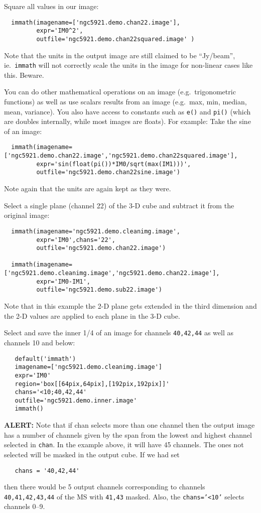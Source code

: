 Square all values in our image:
\small
\begin{verbatim}
  immath(imagename=['ngc5921.demo.chan22.image'],
         expr='IM0^2',
         outfile='ngc5921.demo.chan22squared.image' )
\end{verbatim}
\normalsize
Note that the units in the output image are still claimed to be
``Jy/beam'', ie.\ {\tt immath} will not correctly scale the units
in the image for non-linear cases like this.  Beware.

You can do other mathematical operations on an image (e.g.\
trigonometric functions) as well as use scalars results from an image
(e.g.\ max, min, median, mean, variance).  You also have access to
constants such as {\tt e()} and {\tt pi()} (which are doubles
internally, while most images are floats). For example:
Take the sine of an image:
\small
\begin{verbatim}
  immath(imagename=['ngc5921.demo.chan22.image','ngc5921.demo.chan22squared.image'],
         expr='sin(float(pi())*IM0/sqrt(max(IM1)))',
         outfile='ngc5921.demo.chan22sine.image')
\end{verbatim}
\normalsize
Note again that the units are again kept as they were.
    
Select a single plane (channel 22) of the 3-D cube and  
subtract it from the original image: 
\small
\begin{verbatim}
  immath(imagename='ngc5921.demo.cleanimg.image',
         expr='IM0',chans='22',
         outfile='ngc5921.demo.chan22.image')

  immath(imagename=['ngc5921.demo.cleanimg.image','ngc5921.demo.chan22.image'],
         expr='IM0-IM1',
         outfile='ngc5921.demo.sub22.image')
\end{verbatim}
\normalsize
Note that in this example the 2-D plane gets extended in the third
dimension and the 2-D values are applied to each plane in the 3-D cube. 

    
Select and save the inner 1/4 of an image for channels {\tt 40,42,44}
as well as channels 10 and below:
\small
\begin{verbatim}
   default('immath')
   imagename=['ngc5921.demo.cleanimg.image']
   expr='IM0'
   region='box[[64pix,64pix],[192pix,192pix]]'
   chans='<10;40,42,44'
   outfile='ngc5921.demo.inner.image'
   immath()
\end{verbatim}
\normalsize
{\bf ALERT:} Note that if chan selects more than one channel then
the output image has a number of channels given by the span from the
lowest and highest channel selected in {\tt chan}.  In the example 
above, it will have 45 channels.  The ones not selected will be masked
in the output cube.  If we had set
\small
\begin{verbatim}
   chans = '40,42,44'
\end{verbatim}
\normalsize
then there would be 5 output channels corresponding to channels
{\tt 40,41,42,43,44} of the MS with {\tt 41,43} masked.  Also, 
the {\tt chans='<10'} selects channels 0--9.

